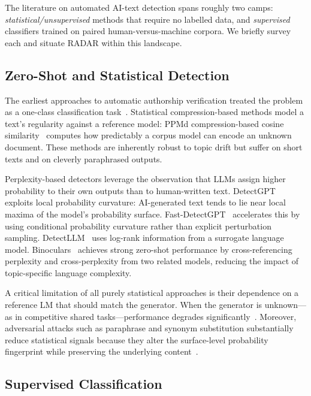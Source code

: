 The literature on automated AI-text detection spans roughly two camps: \emph{statistical/unsupervised}
methods that require no labelled data, and \emph{supervised} classifiers trained on paired
human-versus-machine corpora. We briefly survey each and situate RADAR within this landscape.

\subsection{Zero-Shot and Statistical Detection}

The earliest approaches to automatic authorship verification treated the problem as a
one-class classification task~\cite{koppel:2004}. Statistical compression-based methods
model a text's regularity against a reference model: PPMd compression-based cosine
similarity~\cite{sculley:2006,halvani:2017} computes how predictably a corpus model
can encode an unknown document. These methods are inherently robust to topic drift
but suffer on short texts and on cleverly paraphrased outputs.

Perplexity-based detectors leverage the observation that LLMs assign higher probability
to their own outputs than to human-written text. DetectGPT~\cite{mitchell:2023} exploits
local probability curvature: AI-generated text tends to lie near local maxima of the model's
probability surface. Fast-DetectGPT~\cite{bao:2023} accelerates this by using conditional
probability curvature rather than explicit perturbation sampling. DetectLLM~\cite{su:2023}
uses log-rank information from a surrogate language model. Binoculars~\cite{hans:2024}
achieves strong zero-shot performance by cross-referencing perplexity and cross-perplexity
from two related models, reducing the impact of topic-specific language complexity.

A critical limitation of all purely statistical approaches is their dependence on a
reference LM that should match the generator. When the generator is unknown—as in
competitive shared tasks—performance degrades significantly~\cite{sadasivan:2023}.
Moreover, adversarial attacks such as paraphrase and synonym substitution substantially
reduce statistical signals because they alter the surface-level probability fingerprint
while preserving the underlying content~\cite{ippolito:2020}.

\subsection{Supervised Classification}


